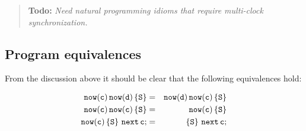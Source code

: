 \documentclass{article}
\newcommand \todo[1] {\begin{quotation}{\bf Todo:} {\footnotesize\em #1}\end{quotation}}
\begin{document}
\todo{Need natural programming idioms that require multi-clock synchronization.}

\subsection{Program equivalences}

From the discussion above it should be clear that the following
equivalences hold:

\begin{eqnarray}
 {\tt now(c)\, now(d)\,\{S\}} &=& {\tt now(d)\, now(c)\,\{S\}}\\
 {\tt now(c)\, now(c)\,\{S\}} &=& {\tt now(c)\,\{S\}}\\
 {\tt now(c)\, \{S\}\ next\, c;} &=& {\tt \{S\}\ next\, c;}\\
\end{eqnarray}
\end{document}
